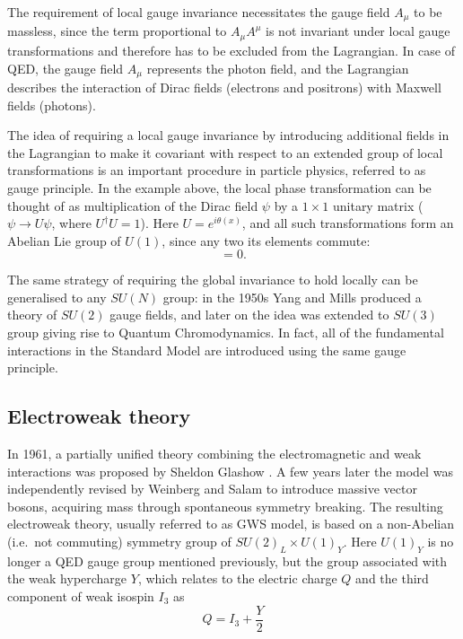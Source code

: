 The requirement of local gauge invariance necessitates the gauge field $A_\mu$ to be massless, since the term
proportional to $A_\mu A^\mu$ is not invariant under local gauge transformations and therefore has to be excluded from
the Lagrangian. In case of QED, the gauge field $A_\mu$ represents the photon field, and the Lagrangian describes the
interaction of Dirac fields (electrons and positrons) with Maxwell fields (photons).

The idea of requiring a local gauge invariance by introducing additional fields in the Lagrangian to make it covariant
with respect to an extended group of local transformations is an important procedure in particle physics, referred to as
gauge principle. In the example above, the local phase transformation can be thought of as multiplication of the Dirac
field $\psi$ by a $1 \times 1$ unitary matrix ($\psi \rightarrow U \psi$, where $U^{\dag}U = 1$). Here $U = e^{i
\theta(x)}$, and all such transformations form an Abelian Lie group of $U(1)$, since any two its elements commute:
\begin{equation}
[e^{i \theta(x)},~e^{i\theta(x')}] = 0.
\end{equation}

The same strategy of requiring the global invariance to hold locally can be generalised to any $SU(N)$ group: in the
1950s Yang and Mills produced a theory of $SU(2)$ gauge fields, and later on the idea was extended to $SU(3)$ group
giving rise to Quantum Chromodynamics. In fact, all of the fundamental interactions in the Standard Model are introduced
using the same gauge principle.

\newpage
\subsection{Electroweak theory}
\label{ss:electroweak_theory}
In 1961, a partially unified theory combining the electromagnetic and weak interactions was proposed by Sheldon Glashow
\autocite{Glashow}. A few years later the model was independently revised by Weinberg \autocite{Weinberg} and Salam
\autocite{Salam} to introduce massive vector bosons, acquiring mass through spontaneous symmetry breaking. The resulting
electroweak theory, usually referred to as GWS model, is based on a non-Abelian (i.e.\ not commuting) symmetry group of
$SU(2)_L \times U(1)_Y$. Here $U(1)_Y$ is no longer a QED gauge group mentioned previously, but the group associated
with the weak hypercharge $Y$, which relates to the electric charge $Q$ and the third component of weak isospin $I_3$
as
\begin{equation}
Q = I_3 + \frac{Y}{2} 
\end{equation} 

